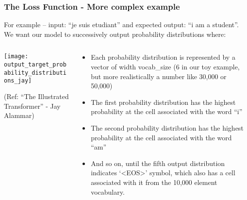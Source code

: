 \begin{frame}[fragile]\frametitle{The Loss Function - More complex example}

For example – input: ``je suis etudiant'' and expected output: ``i am a student''. We want our model to successively output probability distributions where:

\begin{columns}
    \begin{column}[T]{0.5\linewidth}
\begin{center}
\texttt{[image: output\_target\_probability\_distributions\_jay]}


{\tiny (Ref: ``The Illustrated Transformer'' - Jay Alammar)}
\end{center}		

		\end{column}
    \begin{column}[T]{0.5\linewidth}

\begin{itemize}
\item Each probability distribution is represented by a vector of width vocab\_size (6 in our toy example, but more realistically a number like 30,000 or 50,000)
\item The first probability distribution has the highest probability at the cell associated with the word “i”
\item The second probability distribution has the highest probability at the cell associated with the word “am”
\item And so on, until the fifth output distribution indicates ‘<EOS>’ symbol, which also has a cell associated with it from the 10,000 element vocabulary.
\end{itemize}
    \end{column}
  \end{columns}	

\end{frame}


